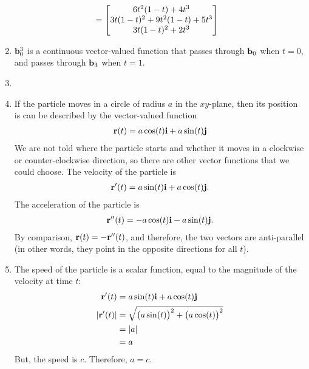 \documentclass{article}
\begin{document}
\begin{enumerate}
\begin{align*}
  &=  \begin{bmatrix} 6 t^2(1-t) + 4t^3\\3 t(1-t)^2 +  9 t^2(1-t) + 5 t^3\\3 t(1-t)^2 +2t^3\end{bmatrix}  
\end{align*}
\item $\mathbf{b}_0^3$ is a continuous vector-valued function that passes through $ \mathbf{b}_0$ when $t=0$, and passes through $ \mathbf{b}_3$ when $t=1$. 
\EEN
\item %
\BEN
\item If the particle moves in a circle of radius $a$ in the $xy$-plane, then its position is can be described by the vector-valued function
\begin{align*}
  \mathbf{r}(t) = a \cos( t)\mathbf{i} + a \sin( t)\mathbf{j}
\end{align*}
We are not told where the particle starts and whether it moves in a clockwise or counter-clockwise direction, so there are other vector functions that we could choose. The velocity of the particle is 
\begin{align*}
  \mathbf{r}'(t) = a \sin( t)\mathbf{i} + a \cos(t)\mathbf{j}.
\end{align*}
The acceleration of the particle is 
\begin{align*}
  \mathbf{r}''(t) = - a \cos( t)\mathbf{i} - a \sin(t)\mathbf{j}.
\end{align*}
By comparison, $\mathbf{r}(t) =  - \mathbf{r}''(t)$, and therefore, the two vectors are anti-parallel (in other words, they point in the opposite directions  for all $t$). 

\item
The speed of the particle is a scalar function, equal to the magnitude of the velocity at time $t$:
 \begin{align*}
  \mathbf{r}'(t) &= a \sin( t)\mathbf{i} + a \cos(t)\mathbf{j} \\
  |\mathbf{r}'(t)| &= \sqrt{ \big(a \sin( t)\big)^2 + \big(a \cos(t)\big)^2} \\  
  &= |a|\\
  &= a
\end{align*}
But, the speed is $c$. Therefore, $a= c$.
\EEN

\end{enumerate}
\end{document}
